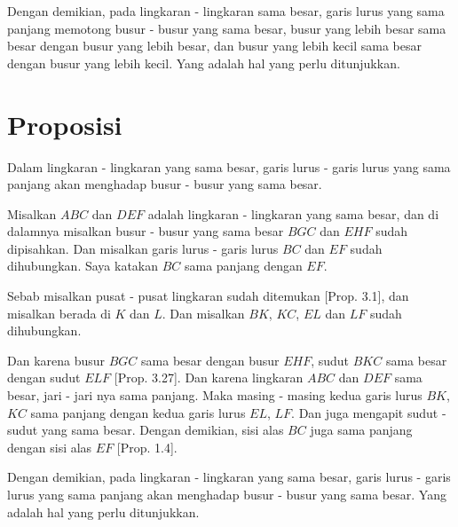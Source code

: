 \documentclass[a4paper]{book}
\begin{document}
Dengan demikian, pada lingkaran - lingkaran sama besar, garis lurus yang sama
panjang memotong busur - busur yang sama besar, busur yang lebih besar sama besar
dengan busur yang lebih besar, dan busur yang lebih kecil sama besar dengan
busur yang lebih kecil. Yang adalah hal yang perlu ditunjukkan.

\section*{\centering Proposisi \thesection}
Dalam lingkaran - lingkaran yang sama besar, garis lurus - garis lurus yang
sama panjang akan menghadap busur - busur yang sama besar.
\begin{center}
\end{center}
Misalkan $ABC$ dan $DEF$ adalah lingkaran - lingkaran yang sama besar, dan 
di dalamnya misalkan busur - busur yang sama besar $BGC$ dan $EHF$ sudah 
dipisahkan. Dan 
misalkan garis lurus - garis lurus $BC$ dan $EF$ sudah dihubungkan. Saya 
katakan $BC$ sama panjang dengan $EF$.

Sebab misalkan pusat - pusat lingkaran sudah ditemukan [Prop. 3.1], dan 
misalkan berada di $K$ dan $L$. Dan misalkan $BK$, $KC$, $EL$ dan $LF$ sudah
dihubungkan.

Dan karena busur $BGC$ sama besar dengan busur $EHF$, sudut $BKC$ sama besar
dengan sudut $ELF$ [Prop. 3.27]. Dan karena lingkaran $ABC$ dan $DEF$ sama
besar, jari - jari nya sama panjang. Maka masing - masing kedua garis lurus 
$BK$, $KC$ sama panjang dengan kedua garis lurus $EL$, $LF$. Dan juga
mengapit sudut - sudut yang sama besar. Dengan demikian, sisi alas $BC$
juga sama panjang dengan sisi alas $EF$ [Prop. 1.4].

Dengan demikian, pada lingkaran - lingkaran yang sama besar, garis lurus - garis
lurus yang sama panjang akan menghadap busur - busur yang sama besar. Yang
adalah hal yang perlu ditunjukkan.
\end{document}
